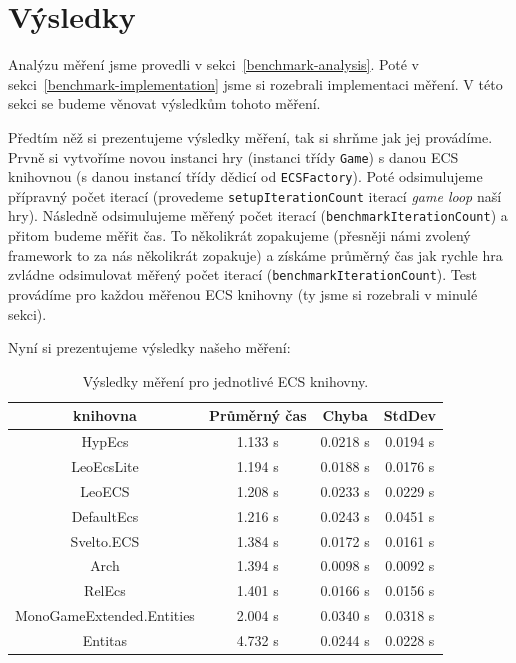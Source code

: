 \section{Výsledky}
\label{sec:benchmark-results}
Analýzu měření jsme provedli v sekci~\ref{benchmark-analysis}. Poté v sekci~\ref{benchmark-implementation} jsme si rozebrali implementaci měření. V této sekci se budeme věnovat výsledkům tohoto měření.

Předtím něž si prezentujeme výsledky měření, tak si shrňme jak jej provádíme. Prvně si vytvoříme novou instanci hry (instanci třídy \texttt{Game}) s danou ECS knihovnou (s danou instancí třídy dědicí od \texttt{ECSFactory}). Poté odsimulujeme přípravný počet iterací (provedeme \texttt{setupIterationCount} iterací \textit{game loop} naší hry). Následně odsimulujeme měřený počet iterací (\texttt{benchmarkIterationCount}) a přitom budeme měřit čas. To několikrát zopakujeme (přesněji námi zvolený framework to za nás několikrát zopakuje) a získáme průměrný čas jak rychle hra zvládne odsimulovat měřený počet iterací (\texttt{benchmarkIterationCount}). Test provádíme pro každou měřenou ECS knihovny (ty jsme si rozebrali v minulé sekci).

Nyní si prezentujeme výsledky našeho měření:

\begin{table}[!htb]
    \centering\footnotesize\sf
    \begin{tabular}{c c c c}
        \toprule
        knihovna & Průměrný čas & Chyba & StdDev \\
        \midrule
        HypEcs & 1.133 s & 0.0218 s & 0.0194 s \\
        LeoEcsLite & 1.194 s & 0.0188 s & 0.0176 s \\
        LeoECS & 1.208 s & 0.0233 s & 0.0229 s \\
        DefaultEcs & 1.216 s & 0.0243 s & 0.0451 s \\
        Svelto.ECS & 1.384 s & 0.0172 s & 0.0161 s \\
        Arch & 1.394 s & 0.0098 s & 0.0092 s \\
        RelEcs & 1.401 s & 0.0166 s & 0.0156 s \\
        MonoGameExtended.Entities & 2.004 s & 0.0340 s & 0.0318 s \\
        Entitas & 4.732 s & 0.0244 s & 0.0228 s \\
        \bottomrule
    \end{tabular}
    \caption{Výsledky měření pro jednotlivé ECS knihovny.}
    \label{tab:benchmark-results}
\end{table}

